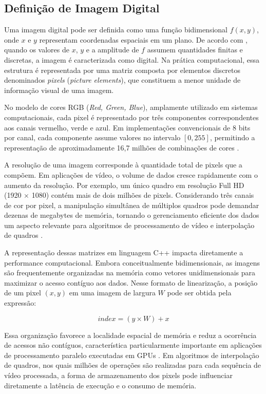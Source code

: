 \documentclass[
    12pt,                %
    openright,           %
    oneside,             %
    a4paper,             %
    english,             %
    brazil               %
]{abntex2}
\begin{document}
\subsection{Definição de Imagem Digital}

Uma imagem digital pode ser definida como uma função bidimensional $f(x, y)$, onde $x$ e $y$ representam coordenadas espaciais em um plano. De acordo com , quando os valores de $x$, $y$ e a amplitude de $f$ assumem quantidades finitas e discretas, a imagem é caracterizada como digital. Na prática computacional, essa estrutura é representada por uma matriz composta por elementos discretos denominados \textit{pixels} (\textit{picture elements}), que constituem a menor unidade de informação visual de uma imagem.

No modelo de cores RGB (\textit{Red, Green, Blue}), amplamente utilizado em sistemas computacionais, cada pixel é representado por três componentes correspondentes aos canais vermelho, verde e azul. Em implementações convencionais de 8 bits por canal, cada componente assume valores no intervalo $[0,255]$, permitindo a representação de aproximadamente 16,7 milhões de combinações de cores \cite{Szeliski2022}.

A resolução de uma imagem corresponde à quantidade total de pixels que a compõem. Em aplicações de vídeo, o volume de dados cresce rapidamente com o aumento da resolução. Por exemplo, um único quadro em resolução Full HD (1920 $\times$ 1080) contém mais de dois milhões de pixels. Considerando três canais de cor por pixel, a manipulação simultânea de múltiplos quadros pode demandar dezenas de megabytes de memória, tornando o gerenciamento eficiente dos dados um aspecto relevante para algoritmos de processamento de vídeo e interpolação de quadros \cite{Szeliski2022}.

A representação dessas matrizes em linguagem C++ impacta diretamente a performance computacional. Embora conceitualmente bidimensionais, as imagens são frequentemente organizadas na memória como vetores unidimensionais para maximizar o acesso contíguo aos dados. Nesse formato de linearização, a posição de um pixel $(x, y)$ em uma imagem de largura $W$ pode ser obtida pela expressão:

\[
index = (y \times W) + x
\]

Essa organização favorece a localidade espacial de memória e reduz a ocorrência de acessos não contíguos, característica particularmente importante em aplicações de processamento paralelo executadas em GPUs \cite{Szeliski2022,Kirk2023}. Em algoritmos de interpolação de quadros, nos quais milhões de operações são realizadas para cada sequência de vídeo processada, a forma de armazenamento dos pixels pode influenciar diretamente a latência de execução e o consumo de memória.
\end{document}

